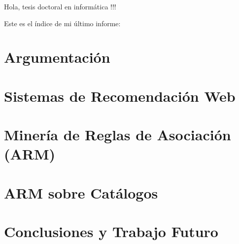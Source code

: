 \documentclass[utf8]{book}
\begin{document}
Hola, tesis doctoral en informática !!!
\newpage

%


Este es el índice de mi último informe: 

\tableofcontents

\chapter*{Argumentación}
\label{chap:argumentacion}





\chapter{Sistemas de Recomendación Web}
\label{chap:SRW}





\chapter{Minería de Reglas de Asociación (ARM)}
\label{chap:arm}





\chapter{ARM sobre Catálogos}
\label{chap:catalogos}





\chapter{Conclusiones y Trabajo Futuro}
\label{chap:conclusiones-y-trabajo-futuro}


\end{document}
